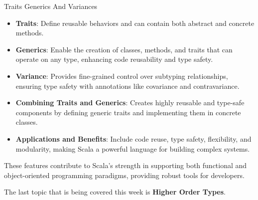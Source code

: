 \begin{notes}{Traits Generics And Variances}
\begin{highlight}
        \begin{itemize}
            \item \textbf{Traits}: Define reusable behaviors and can contain both abstract and concrete methods.
            \item \textbf{Generics}: Enable the creation of classes, methods, and traits that can operate on any type, enhancing code reusability and type safety.
            \item \textbf{Variance}: Provides fine-grained control over subtyping relationships, ensuring type safety with annotations like covariance and contravariance.
            \item \textbf{Combining Traits and Generics}: Creates highly reusable and type-safe components by defining generic traits and implementing them in concrete classes.
            \item \textbf{Applications and Benefits}: Include code reuse, type safety, flexibility, and modularity, making Scala a powerful language for building complex systems.
        \end{itemize}
    
        These features contribute to Scala's strength in supporting both functional and object-oriented programming paradigms, providing robust tools for developers.
    
    \end{highlight}
\end{notes}

The last topic that is being covered this week is \textbf{Higher Order Types}.

